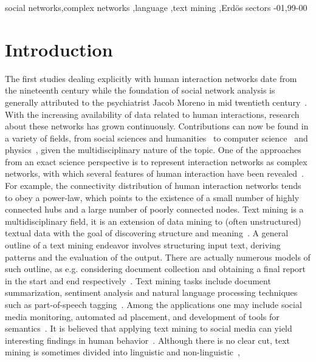 \documentclass[review]{elsarticle}
\begin{document}
\begin{frontmatter}
\begin{keyword}
social networks\sep complex networks \sep language \sep text mining \sep Erdös sectors
-01\sep  99-00
\end{keyword}

\end{frontmatter}

\linenumbers

\section{Introduction}
The first studies dealing explicitly with human interaction networks
date from the nineteenth century while the foundation of
social network analysis is generally attributed to the psychiatrist Jacob Moreno in mid twentieth century~\cite{moreno,newmanBook}.
With the increasing availability of data related to human interactions, research about these networks has grown continuously.
Contributions can now be found in a variety of fields, from social sciences and humanities~\cite{latour2013} to computer science~\cite{bird} and physics~\cite{barabasiHumanDyn,newmanFriendship}, given the multidisciplinary nature of the topic.
One of the approaches from an exact science perspective is to represent interaction networks as complex networks, with which 
several features of human interaction have been revealed~\cite{barabasiHumanDyn,newmanFriendship}.
For example, the connectivity distribution of human interaction networks tends to obey a power-law,
which points to the existence of a small number of highly connected hubs and a large number of poorly connected nodes.
Text mining is a multidisciplinary field,
it is an extension of data mining to (often unstructured) textual data
with the goal of discovering structure and meaning~\cite{customText}.
A general outline of a text mining endeavor involves structuring input text,
deriving patterns and the evaluation of the output.
There are actually numerous models of such outline,
as e.g. considering document collection and obtaining a final report in the
start and end respectively~\cite{textSurvey}.
Text mining tasks include document summarization, sentiment analysis
and natural language processing techniques such as part-of-speech tagging~\cite{nltk}.
Among the applications one may include social media monitoring, automated ad placement, and development of tools for 
semantics~\cite{textSurvey}.
It is believed that applying text mining to social media
can yield interesting findings in human behavior~\cite{customText}.
Although there is no clear cut, text mining is sometimes divided into linguistic and non-linguistic~\cite{customText},
\end{document}
